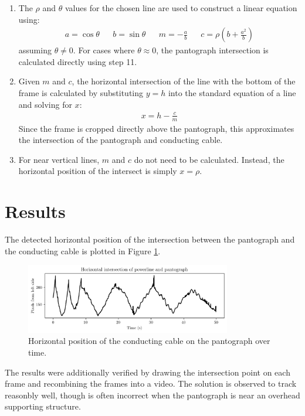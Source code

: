 \begin{enumerate}
  \item The $\rho$ and $\theta$ values for the chosen line are used to construct a linear equation using:
  \begin{align}
    a = \cos\theta && b = \sin\theta && m = -\frac{a}{b} && c = \rho \left(b + \frac{a^2}{b}\right)
  \end{align}
  assuming $\theta \neq 0$. For cases where $\theta \approx 0$, the pantograph intersection is calculated directly using step 11.

  \item Given $m$ and $c$, the horizontal intersection of the line with the bottom of the frame is calculated by substituting $y=h$ into the standard equation of a line and solving for $x$:
  \begin{align}
    x = h - \frac{c}{m}
  \end{align}
  Since the frame is cropped directly above the pantograph, this approximates the intersection of the pantograph and conducting cable.

  \item For near vertical lines, $m$ and $c$ do not need to be calculated. Instead, the horizontal position of the intersect is simply $x=\rho$.

\end{enumerate}

\section{Results}

The detected horizontal position of the intersection between the pantograph and the conducting cable is plotted in Figure \ref{fig:q2results}.

\begin{figure}[ht]
  \centering
  \includegraphics[width=0.8\textwidth]{images/q2_results.png}
  \caption{Horizontal position of the conducting cable on the pantograph over time.}
  \label{fig:q2results}
\end{figure}

The results were additionally verified by drawing the intersection point on each frame and recombining the frames into a video. The solution is observed to track reasonbly well, though is often incorrect when the pantograph is near an overhead supporting structure.

